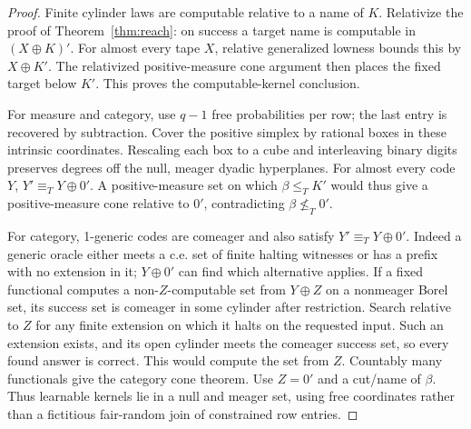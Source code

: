 \begin{proof}
Finite cylinder laws are computable relative to a name of $K$.
Relativize the proof of Theorem~\ref{thm:reach}: on success a target
name is computable in $(X\oplus K)'$. For almost every tape $X$,
relative generalized lowness bounds this by $X\oplus K'$.
The relativized positive-measure cone argument then places the
fixed target below $K'$. This proves the computable-kernel conclusion.

For measure and category, use $q-1$ free probabilities per row;
the last entry is recovered by subtraction. Cover the positive
simplex by rational boxes in these intrinsic coordinates. Rescaling
each box to a cube and interleaving binary digits preserves degrees
off the null, meager dyadic hyperplanes. For almost every code $Y$,
$Y'\equiv_TY\oplus0'$. A positive-measure set on which
$\beta\leq_TK'$ would thus give a positive-measure cone relative
to $0'$, contradicting $\beta\not\leq_T0'$.

For category, 1-generic codes are comeager and also satisfy
$Y'\equiv_TY\oplus0'$. Indeed a generic oracle either meets a
c.e. set of finite halting witnesses or has a prefix with no
extension in it; $Y\oplus0'$ can find which alternative applies.
If a fixed functional computes a non-$Z$-computable set from
$Y\oplus Z$ on a nonmeager Borel set, its success set is comeager
in some cylinder after restriction. Search relative to $Z$ for any
finite extension on which it halts on the requested input. Such an
extension exists, and its open cylinder meets the comeager success
set, so every found answer is correct. This would compute the set
from $Z$. Countably many functionals give the category cone theorem.
Use $Z=0'$ and a cut/name of $\beta$. Thus learnable kernels lie
in a null and meager set, using free coordinates rather than a
fictitious fair-random join of constrained row entries.


\end{proof}
